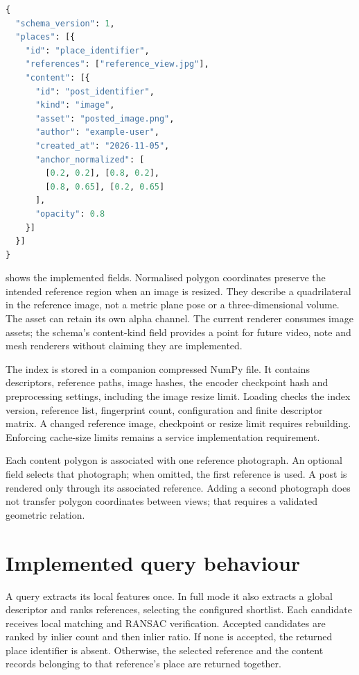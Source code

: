 \begin{lstlisting}[float=htbp,language=Python,caption={Implemented place-record structure with illustrative identifiers. The numerical anchor coordinates are configuration values, not experimental results.},label={lst:schema},numbers=none]
{
  "schema_version": 1,
  "places": [{
    "id": "place_identifier",
    "references": ["reference_view.jpg"],
    "content": [{
      "id": "post_identifier",
      "kind": "image",
      "asset": "posted_image.png",
      "author": "example-user",
      "created_at": "2026-11-05",
      "anchor_normalized": [
        [0.2, 0.2], [0.8, 0.2],
        [0.8, 0.65], [0.2, 0.65]
      ],
      "opacity": 0.8
    }]
  }]
}
\end{lstlisting}

 shows the implemented fields. Normalised polygon coordinates preserve the intended reference region when an image is resized. They describe a quadrilateral in the reference image, not a metric plane pose or a three-dimensional volume. The asset can retain its own alpha channel. The current renderer consumes image assets; the schema's content-kind field provides a point for future video, note and mesh renderers without claiming they are implemented.

The index is stored in a companion compressed NumPy file. It contains descriptors, reference paths, image hashes, the encoder checkpoint hash and preprocessing settings, including the image resize limit. Loading checks the index version, reference list, fingerprint count, configuration and finite descriptor matrix. A changed reference image, checkpoint or resize limit requires rebuilding. Enforcing cache-size limits remains a service implementation requirement.

Each content polygon is associated with one reference photograph. An optional  field selects that photograph; when omitted, the first reference is used. A post is rendered only through its associated reference. Adding a second photograph does not transfer polygon coordinates between views; that requires a validated geometric relation.

\section{Implemented query behaviour}
A query extracts its local features once. In full mode it also extracts a global descriptor and ranks references, selecting the configured shortlist. Each candidate receives local matching and RANSAC verification. Accepted candidates are ranked by inlier count and then inlier ratio. If none is accepted, the returned place identifier is absent. Otherwise, the selected reference and the content records belonging to that reference's place are returned together.


